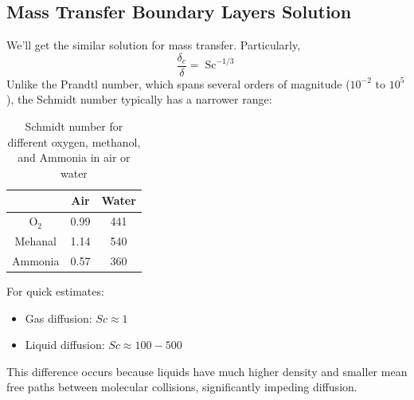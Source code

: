 \subsection*{Mass Transfer Boundary Layers Solution}
We'll get the similar solution for mass transfer. Particularly,
\[
        \frac{\delta_c}{\delta} = \operatorname{Sc}^{-1/3}
\]
%
Unlike the Prandtl number, which spans several orders of magnitude ($10^{-2}$ to $10^5$), the Schmidt number typically has a narrower range:
%
\begin{table}[H]
    \centering
    \caption{Schmidt number for different oxygen, methanol, and Ammonia in air or water}
    \begin{tabular}{c|c|c} 
        & Air & Water \\
        \hline $\mathrm{O}_2$ & 0.99 & 441 \\
        Mehanal & 1.14 & 540 \\
        Ammonia & 0.57 & 360
    \end{tabular}
\end{table}
%
For quick estimates:
\begin{itemize}
    \item Gas diffusion: $Sc \approx 1$
    \item Liquid diffusion: $Sc \approx 100-500$
\end{itemize}

This difference occurs because liquids have much higher density and smaller mean free paths between molecular collisions, significantly impeding diffusion.
